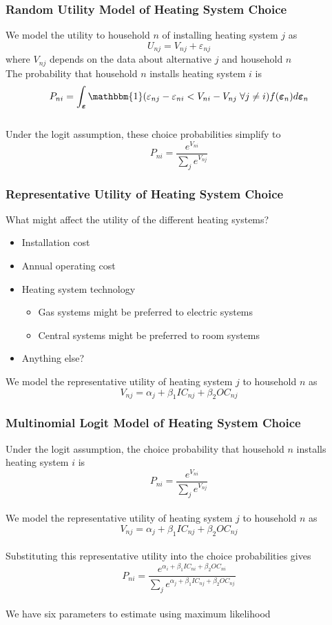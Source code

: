 \documentclass{beamer}\usepackage[]{graphicx}\usepackage[]{color}
\begin{document}
\begin{frame}\frametitle{Random Utility Model of Heating System Choice}
    We model the utility to household $n$ of installing heating system $j$ as
    $$U_{nj} = V_{nj} + \varepsilon_{nj}$$
    where $V_{nj}$ depends on the data about alternative $j$ and household $n$ \\
    \vspace{3ex}
    The probability that household $n$ installs heating system $i$ is
 	$$P_{ni} = \int_{\bm{\varepsilon}} \mathbbm{1}(\varepsilon_{nj} - \varepsilon_{ni} < V_{ni} - V_{nj} \; \forall j \neq i) f(\bm{\varepsilon}_n) d\bm{\varepsilon}_n$$ \\
 	\vspace{2ex}
  	Under the logit assumption, these choice probabilities simplify to
    $$P_{ni} = \frac{e^{V_{ni}}}{\sum_j e^{V_{nj}}}$$
\end{frame}

\begin{frame}\frametitle{Representative Utility of Heating System Choice}
	What might affect the utility of the different heating systems?
	\begin{itemize}
		\item Installation cost
		\item Annual operating cost
		\item Heating system technology
		\begin{itemize}
			\item Gas systems might be preferred to electric systems
			\item Central systems might be preferred to room systems
		\end{itemize}
		\item Anything else?
	\end{itemize}
    \vspace{3ex}
    We model the representative utility of heating system $j$ to household $n$ as
    $$V_{nj} = \alpha_j + \beta_1 IC_{nj} + \beta_2 OC_{nj}$$
\end{frame}

\begin{frame}\frametitle{Multinomial Logit Model of Heating System Choice}
    Under the logit assumption, the choice probability that household $n$ installs heating system $i$ is
    $$P_{ni} = \frac{e^{V_{ni}}}{\sum_j e^{V_{nj}}}$$ \\
    \vspace{1ex}
    We model the representative utility of heating system $j$ to household $n$ as
    $$V_{nj} = \alpha_j + \beta_1 IC_{nj} + \beta_2 OC_{nj}$$ \\
    \vspace{1ex}
    Substituting this representative utility into the choice probabilities gives
    $$P_{ni} = \frac{e^{\alpha_i + \beta_1 IC_{ni} + \beta_2 OC_{ni}}}{\sum_j e^{\alpha_j + \beta_1 IC_{nj} + \beta_2 OC_{nj}}}$$ \\
    \vspace{1ex}
    We have six parameters to estimate using maximum likelihood
\end{frame}
\end{document}
